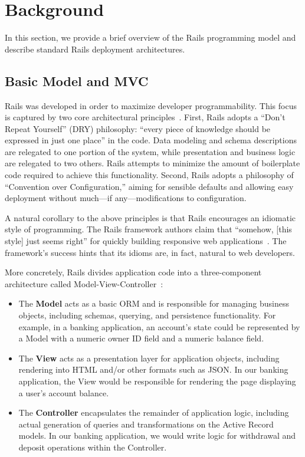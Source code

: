 
\section{Background}
\label{sec:motivation}

In this section, we provide a brief overview of the Rails programming model and describe standard Rails deployment architectures.

\subsection{Basic Model and MVC}

Rails was developed in order to maximize developer programmability. This focus is captured by two core architectural principles~\cite{rails-book}. First, Rails adopts a ``Don't Repeat Yourself'' (DRY) philosophy: ``every piece of knowledge should be expressed in just one place'' in the code. Data modeling and schema descriptions are relegated to one portion of the system, while presentation and business logic are relegated to two others. Rails attempts to minimize the amount of boilerplate code required to achieve this functionality. Second, Rails adopts a philosophy of ``Convention over Configuration,'' aiming for sensible defaults and allowing easy deployment without much---if any---modifications to configuration.

A natural corollary to the above principles is that Rails encourages an idiomatic style of programming. The Rails framework authors claim that ``somehow, [this style] just seems right'' for quickly building responsive web applications~\cite{rails-book}. The framework's success hints that its idioms are, in fact, natural to web developers.

More concretely, Rails divides application code into a three-component architecture called Model-View-Controller~\cite{gangoffour,mvc}:

\begin{itemize}
\item The \textbf{Model} acts as a basic ORM and is responsible for managing business objects, including schemas, querying, and persistence functionality. For example, in a banking application, an account's state could be represented by a Model with a numeric owner ID field and a numeric balance field.

\item The \textbf{View} acts as a presentation layer for application objects, including rendering into HTML and/or other formats such as JSON. In our banking application, the View would be responsible for rendering the page displaying a user's account balance.

\item The \textbf{Controller} encapsulates the remainder of application logic, including actual generation of queries and transformations on the Active Record models. In our banking application, we would write logic for withdrawal and deposit operations within the Controller.
\end{itemize}


